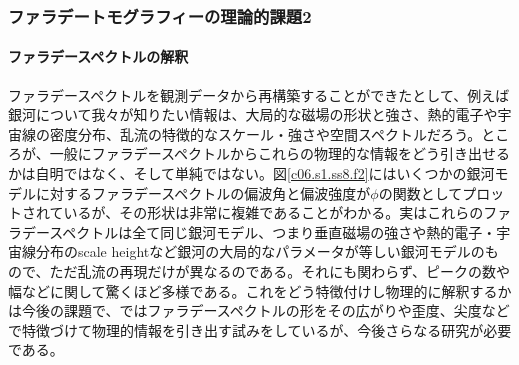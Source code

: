 \subsubsection{ファラデートモグラフィーの理論的課題2}
\label{c06.s1.ss8.sss3}

\paragraph{ファラデースペクトルの解釈}

ファラデースペクトルを観測データから再構築することができたとして、例えば銀河について我々が知りたい情報は、大局的な磁場の形状と強さ、熱的電子や宇宙線の密度分布、乱流の特徴的なスケール・強さや空間スペクトルだろう。ところが、一般にファラデースペクトルからこれらの物理的な情報をどう引き出せるかは自明ではなく、そして単純ではない。図\ref{c06.s1.ss8.f2}にはいくつかの銀河モデルに対するファラデースペクトルの偏波角と偏波強度が$\phi$の関数としてプロットされているが、その形状は非常に複雑であることがわかる。実はこれらのファラデースペクトルは全て同じ銀河モデル、つまり垂直磁場の強さや熱的電子・宇宙線分布のscale heightなど銀河の大局的なパラメータが等しい銀河モデルのもので、ただ乱流の再現だけが異なるのである。それにも関わらず、ピークの数や幅などに関して驚くほど多様である。これをどう特徴付けし物理的に解釈するかは今後の課題で、\cite{2014PASJ...66....5I}ではファラデースペクトルの形をその広がりや歪度、尖度などで特徴づけて物理的情報を引き出す試みをしているが、今後さらなる研究が必要である。



